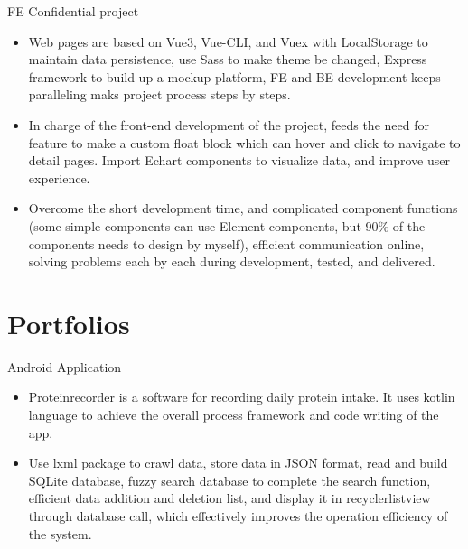 \documentclass{resume}
\newcommand{\en}[1]{#1}
\newcommand{\zh}[1]{}
\begin{document}
\en{}
\zh{\datedsubsection{\textbf{{中科院自动化所}}}{2022/03 -- 2022/04}}
\en{FE Confidential project}
\zh{前端保密项目(外包)}
\begin{itemize}
      \item \en{Web pages are based on Vue3, Vue-CLI, and Vuex with LocalStorage to maintain data persistence, use Sass to make theme be changed, Express framework to build up a mockup platform, FE and BE development keeps paralleling maks project process steps by steps.}
            \zh{页面基于vue3，vue-cli，vuex搭配localstorage实现数据持久化，sass实现风格转换，express搭建mockup前端平台，前后端分离开发，快速迭代。}
      \item \en{In charge of the front-end development of the project, feeds the need for feature to make a custom float block which can hover and click to navigate to detail pages. Import Echart components to visualize data, and improve user experience.}
            \zh{负责前端页面开发，自定义悬浮方块组件并多处复用，满足内容导向功能，引入Echart图表，提高部分页面可视化功能，提高用户体验，解决用户痛点。}
      \item \en{Overcome the short development time, and complicated component functions (some simple components can use Element components, but 90\% of the components needs to design by myself), efficient communication online, solving problems each by each during development, tested, and delivered.}
            \zh{克服开发时间较短（2周），页面功能复杂（部分采用Element组件，页面功能90\%不可使用现有组件库），有效线上沟通，解决页面研发全流程问题，并测试且交付。}
\end{itemize}

\section{\en{Portfolios}\zh{个人项目}}
\en{Android Application}
\zh{安卓应用}
\begin{itemize}
      \item \en{Proteinrecorder is a software for recording daily protein intake. It uses kotlin language to achieve the overall process framework and code writing of the app.}
            \zh{ProteinRecorder 是记录日常蛋白质摄入量的软件，用Kotlin语言实现app的整体流程框架和代码编写。}
      \item \en{Use lxml package to crawl data, store data in JSON format, read and build SQLite database, fuzzy search database to complete the search function, efficient data addition and deletion list, and display it in recyclerlistview through database call, which effectively improves the operation efficiency of the system.}
            \zh{使用 lxml 包爬取数据，json格式存储数据，读取并构建SQLite数据库，模糊搜索数据库以完成搜索功能， 高效的数据添加和删除列表，通过数据库的调用显示到RecyclerListView中，有效的提升了系统的运行效率。}
\end{itemize}
\end{document}
